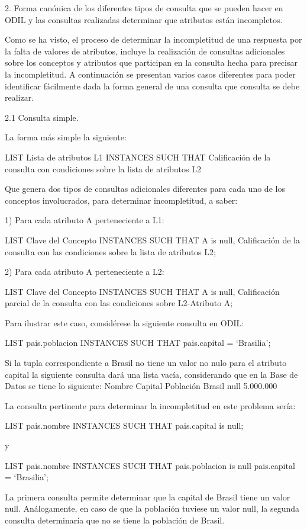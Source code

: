 2. Forma canónica de los diferentes tipos de consulta que se pueden hacer en ODIL y las consultas realizadas determinar que atributos están incompletos.

	Como se ha visto, el proceso de determinar la incompletitud de una respuesta por la falta de valores de atributos, incluye la realización de consultas adicionales sobre los conceptos y atributos que participan en la consulta hecha para precisar la incompletitud. A continuación se presentan varios casos diferentes para poder identificar fácilmente dada la forma general de una consulta que consulta se debe realizar.

2.1 Consulta simple.

La forma más simple la siguiente:

LIST Lista de atributos L1 INSTANCES
SUCH THAT Calificación de la consulta con condiciones sobre la lista de atributos L2

	Que genera dos tipos  de consultas adicionales diferentes para cada uno de los conceptos involucrados, para determinar incompletitud, a saber:

1) Para cada atributo A perteneciente a L1:

LIST Clave del Concepto INSTANCES
SUCH THAT A is null, Calificación de la consulta con las condiciones sobre la lista de atributos L2;

2) Para cada atributo A perteneciente a L2:

LIST Clave del Concepto INSTANCES
SUCH THAT A is null, Calificación parcial de la consulta con las condiciones sobre L2-{Atributo A};

Para ilustrar este caso, considérese la siguiente consulta en ODIL:

LIST pais.poblacion INSTANCES
SUCH THAT pais.capital = ‘Brasilia’;

Si la tupla correspondiente a Brasil no tiene un valor no nulo para el atributo capital la siguiente consulta dará una lista vacía, considerando que en la Base de Datos se tiene lo siguiente:
Nombre	Capital	Población
Brasil	null	5.000.000




	La consulta pertinente para determinar la incompletitud en este problema sería:

LIST pais.nombre INSTANCES
SUCH THAT pais.capital is null;

y

LIST pais.nombre INSTANCES
SUCH THAT pais.poblacion is null   pais.capital = ‘Brasilia’;

La primera consulta permite determinar que la capital de Brasil tiene un valor null. Análogamente, en caso de que la población tuviese un valor null, la segunda consulta determinaría que no se tiene la población de Brasil.


